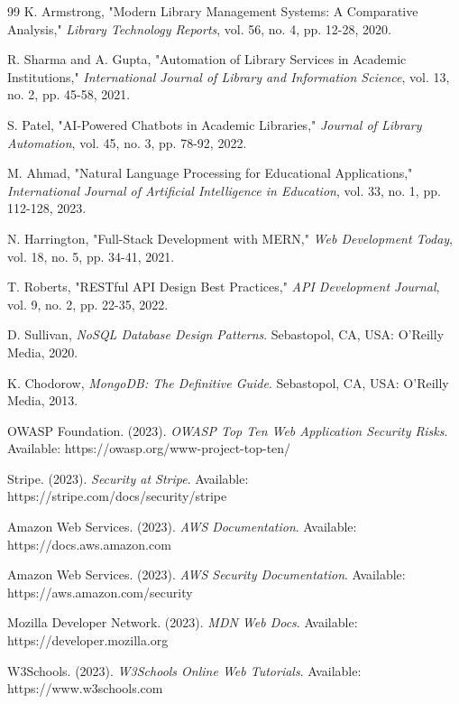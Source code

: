 \documentclass[12pt,a4paper]{report}
\begin{document}
\begin{thebibliography}{99}
K. Armstrong, "Modern Library Management Systems: A Comparative Analysis," 
\textit{Library Technology Reports}, 
vol. 56, no. 4, pp. 12-28, 2020.

R. Sharma and A. Gupta, "Automation of Library Services in Academic Institutions," 
\textit{International Journal of Library and Information Science}, 
vol. 13, no. 2, pp. 45-58, 2021.

S. Patel, "AI-Powered Chatbots in Academic Libraries," 
\textit{Journal of Library Automation}, 
vol. 45, no. 3, pp. 78-92, 2022.

M. Ahmad, "Natural Language Processing for Educational Applications," 
\textit{International Journal of Artificial Intelligence in Education}, 
vol. 33, no. 1, pp. 112-128, 2023.

N. Harrington, "Full-Stack Development with MERN," 
\textit{Web Development Today}, 
vol. 18, no. 5, pp. 34-41, 2021.

T. Roberts, "RESTful API Design Best Practices," 
\textit{API Development Journal}, 
vol. 9, no. 2, pp. 22-35, 2022.

D. Sullivan, \textit{NoSQL Database Design Patterns}. 
Sebastopol, CA, USA: O'Reilly Media, 2020.

K. Chodorow, \textit{MongoDB: The Definitive Guide}. 
Sebastopol, CA, USA: O'Reilly Media, 2013.

OWASP Foundation. (2023). \textit{OWASP Top Ten Web Application Security Risks}. 
Available: https://owasp.org/www-project-top-ten/

Stripe. (2023). \textit{Security at Stripe}. 
Available: https://stripe.com/docs/security/stripe

Amazon Web Services. (2023). \textit{AWS Documentation}. 
Available: https://docs.aws.amazon.com

Amazon Web Services. (2023). \textit{AWS Security Documentation}. 
Available: https://aws.amazon.com/security

Mozilla Developer Network. (2023). \textit{MDN Web Docs}. 
Available: https://developer.mozilla.org

W3Schools. (2023). \textit{W3Schools Online Web Tutorials}. 
Available: https://www.w3schools.com

\end{thebibliography}
\end{document}
